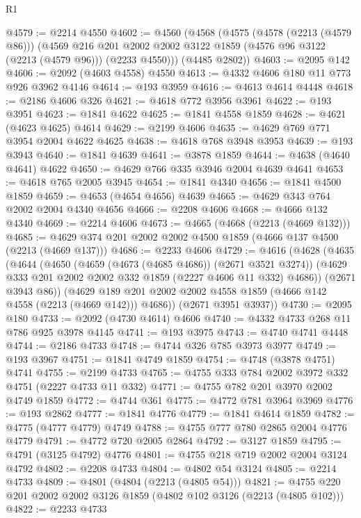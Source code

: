 \begin{lexlean}{R1}
\begin{coremodule}
@4579 := @2214 @4550
@4602 := @4560
    (@4568
      (@4575
        (@4578 (@2213 (@4579 @86)))
        (@4569
          @216
          @201
          @2002
          @2002
          @3122
          @1859
          (@4576 @96 @3122 (@2213 (@4579 @96)))
          (@2233 @4550)))
      (@4485 @2802))
@4603 := @2095 @142
@4606 := @2092 (@4603 @4558) @4550
@4613 := @4332 @4606 @180 @11 @773 @926 @3962 @4146
@4614 := @193 @3959
@4616 := @4613 @4614 @4448
@4618 := @2186 @4606 @326
@4621 := @4618 @772 @3956 @3961
@4622 := @193 @3951
@4623 := @1841 @4622
@4625 := @1841 @4558 @1859
@4628 := @4621 (@4623 @4625) @4614
@4629 := @2199 @4606
@4635 := @4629 @769 @771 @3954 @2004 @4622 @4625
@4638 := @4618 @768 @3948 @3953
@4639 := @193 @3943
@4640 := @1841 @4639
@4641 := @3878 @1859
@4644 := @4638 (@4640 @4641) @4622
@4650 := @4629 @766 @335 @3946 @2004 @4639 @4641
@4653 := @4618 @765 @2005 @3945
@4654 := @1841 @4340
@4656 := @1841 @4500 @1859
@4659 := @4653 (@4654 @4656) @4639
@4665 := @4629 @343 @764 @2002 @2004 @4340 @4656
@4666 := @2208 @4606
@4668 := @4666 @132 @4340
@4669 := @2214 @4606
@4673 := @4665 (@4668 (@2213 (@4669 @132)))
@4685 := @4629 @374 @201 @2002 @2002 @4500 @1859 (@4666 @137 @4500 (@2213 (@4669 @137)))
@4686 := @2233 @4606
@4729 := @4616
    (@4628
      (@4635
        (@4644
          (@4650
            (@4659 (@4673 (@4685 @4686)) (@2671 @3521 @3274))
            (@4629 @333 @201 @2002 @2002 @332 @1859 (@2227 @4606 @11 @332) @4686))
          (@2671 @3943 @86))
        (@4629 @189 @201 @2002 @2002 @4558 @1859 (@4666 @142 @4558 (@2213 (@4669 @142))) @4686))
      (@2671 @3951 @3937))
@4730 := @2095 @180
@4733 := @2092 (@4730 @4614) @4606
@4740 := @4332 @4733 @268 @11 @786 @925 @3978 @4145
@4741 := @193 @3975
@4743 := @4740 @4741 @4448
@4744 := @2186 @4733
@4748 := @4744 @326 @785 @3973 @3977
@4749 := @193 @3967
@4751 := @1841 @4749 @1859
@4754 := @4748 (@3878 @4751) @4741
@4755 := @2199 @4733
@4765 := @4755 @333 @784 @2002 @3972 @332 @4751 (@2227 @4733 @11 @332)
@4771 := @4755 @782 @201 @3970 @2002 @4749 @1859
@4772 := @4744 @361
@4775 := @4772 @781 @3964 @3969
@4776 := @193 @2862
@4777 := @1841 @4776
@4779 := @1841 @4614 @1859
@4782 := @4775 (@4777 @4779) @4749
@4788 := @4755 @777 @780 @2865 @2004 @4776 @4779
@4791 := @4772 @720 @2005 @2864
@4792 := @3127 @1859
@4795 := @4791 (@3125 @4792) @4776
@4801 := @4755 @218 @719 @2002 @2004 @3124 @4792
@4802 := @2208 @4733
@4804 := @4802 @54 @3124
@4805 := @2214 @4733
@4809 := @4801 (@4804 (@2213 (@4805 @54)))
@4821 := @4755 @220 @201 @2002 @2002 @3126 @1859 (@4802 @102 @3126 (@2213 (@4805 @102)))
@4822 := @2233 @4733

\end{coremodule}
\end{lexlean}
